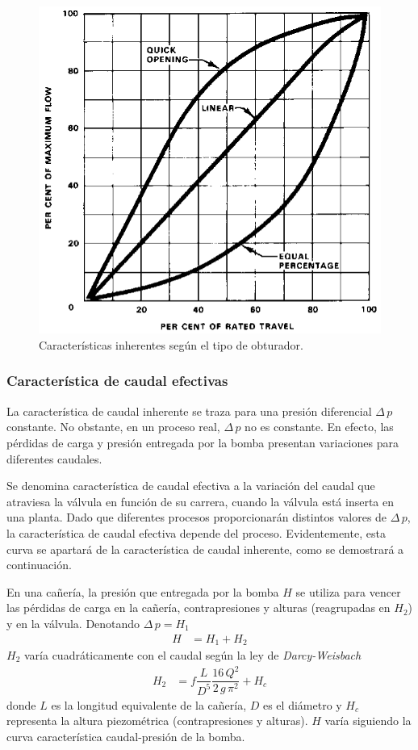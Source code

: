 \begin{figure}
 \centering
 \includegraphics[scale=1.5]{Cap2-DisenoEnsamblado/images/Inherente.png}
 \caption{Características inherentes según el tipo de obturador.}
 \label{fig:caractInherente}
\end{figure}


\subsubsection{Característica de caudal efectivas}

La característica de caudal inherente se traza para una presión diferencial
$\Delta \,p$ constante.
No obstante, en un proceso real, $\Delta \,p$ no es constante.
En efecto, las pérdidas de carga y presión entregada por la bomba presentan
variaciones para diferentes caudales.

Se denomina característica de caudal efectiva a la variación del
caudal que atraviesa la válvula en función de su carrera, cuando la
válvula está inserta en una planta.
Dado que diferentes procesos proporcionarán distintos valores de  $\Delta
\,p$, la característica de caudal efectiva depende del proceso.
Evidentemente, esta curva se apartará de la característica de caudal inherente,
como se demostrará a continuación.

En una cañería, la presión que entregada por la bomba $H$ se utiliza para
vencer las pérdidas de carga en la cañería, contrapresiones y alturas
(reagrupadas en $H_2$) y en la válvula.
Denotando $\Delta \,p = H_1$
\begin{align}
 H &= H_1 + H_2
\end{align}
$H_2$ varía cuadráticamente con el caudal según la ley de \emph{Darcy-Weisbach}
\cite{bib:Franzini}
\begin{align}
 H_2  &= f \dfrac{L}{D^5}\dfrac{16\,Q^2}{2\,g\,\pi^2} + H_c
\end{align}
donde $L$ es la longitud equivalente de la cañería, $D$ es el diámetro y $H_c$
representa la altura piezométrica (contrapresiones y alturas).
$H$ varía siguiendo la curva característica caudal-presión de la bomba.

